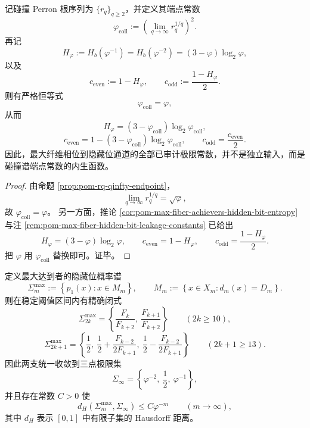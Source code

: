\begin{theorem}[碰撞谱对隐藏位泄露常数的自校准]\label{thm:conclusion-maxfiber-hiddenbit-collision-selfcalibration}
记碰撞 Perron 根序列为 \(\{r_q\}_{q\ge 2}\)，并定义其端点常数
\[
\varphi_{\mathrm{coll}}
:=
\left(\lim_{q\to\infty}r_q^{1/q}\right)^2.
\]
再记
\[
H_\varphi:=H_b(\varphi^{-1})=H_b(\varphi^{-2})=(3-\varphi)\log_2\varphi,
\]
以及
\[
c_{\mathrm{even}}:=1-H_\varphi,
\qquad
c_{\mathrm{odd}}:=\frac{1-H_\varphi}{2}.
\]
则有严格恒等式
\[
\varphi_{\mathrm{coll}}=\varphi,
\]
从而
\[
H_\varphi=(3-\varphi_{\mathrm{coll}})\log_2\varphi_{\mathrm{coll}},
\]
\[
c_{\mathrm{even}}
=
1-(3-\varphi_{\mathrm{coll}})\log_2\varphi_{\mathrm{coll}},
\qquad
c_{\mathrm{odd}}=\frac{c_{\mathrm{even}}}{2}.
\]
因此，最大纤维相位到隐藏位通道的全部已审计极限常数，并不是独立输入，而是碰撞谱端点常数的内生函数。
\end{theorem}

\begin{proof}
由命题 \ref{prop:pom-rq-qinfty-endpoint}，
\[
\lim_{q\to\infty}r_q^{1/q}=\sqrt{\varphi},
\]
故 \(\varphi_{\mathrm{coll}}=\varphi\)。
另一方面，推论 \ref{cor:pom-max-fiber-achievers-hidden-bit-entropy} 与注 \ref{rem:pom-max-fiber-hidden-bit-leakage-constants} 已给出
\[
H_\varphi=(3-\varphi)\log_2\varphi,
\qquad
c_{\mathrm{even}}=1-H_\varphi,
\qquad
c_{\mathrm{odd}}=\frac{1-H_\varphi}{2}.
\]
把 \(\varphi\) 用 \(\varphi_{\mathrm{coll}}\) 替换即可。证毕。
\end{proof}

\begin{theorem}\label{thm:conclusion-maxfiber-hiddenbit-spectrum-hausdorff-convergence}
定义最大达到者的隐藏位概率谱
\[
\Sigma_m^{\max}:=\left\{p_1(x):x\in M_m\right\},
\qquad
M_m:=\left\{x\in X_m:d_m(x)=D_m\right\}.
\]
则在稳定阈值区间内有精确闭式
\[
\Sigma_{2k}^{\max}
=
\left\{
\frac{F_k}{F_{k+2}},\ \frac{F_{k+1}}{F_{k+2}}
\right\}
\qquad (2k\ge 10),
\]
\[
\Sigma_{2k+1}^{\max}
=
\left\{
\frac12,\ \frac12+\frac{F_{k-2}}{2F_{k+1}},\ \frac12-\frac{F_{k-2}}{2F_{k+1}}
\right\}
\qquad (2k+1\ge 13).
\]
因此两支统一收敛到三点极限集
\[
\Sigma_\infty=\left\{\varphi^{-2},\ \frac12,\ \varphi^{-1}\right\},
\]
并且存在常数 \(C>0\) 使
\[
d_H(\Sigma_m^{\max},\Sigma_\infty)\le C\varphi^{-m}
\qquad (m\to\infty),
\]
其中 \(d_H\) 表示 \([0,1]\) 中有限子集的 Hausdorff 距离。
\end{theorem}

